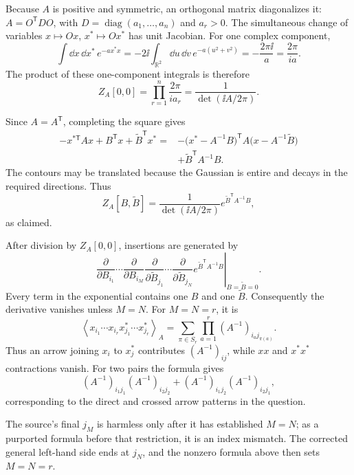 
\begin{enumerate}
Because \(A\) is positive and symmetric, an orthogonal matrix diagonalizes
it: \(A=O^{\mathsf T}DO\), with \(D=\operatorname{diag}(a_1,\ldots,a_n)\) and
\(a_r>0\).  The simultaneous change of variables
\(x\mapsto Ox\), \(x^*\mapsto Ox^*\) has unit Jacobian.  For one complex
component,
\[
 \int \dd x\,\dd x^*\,e^{-a x^*x}
 =-2\ii\int_{\mathbb R^2}\dd u\,\dd v\,e^{-a(u^2+v^2)}
 =-\frac{2\pi \ii}{a}=\frac{2\pi}{ia}.
\]
The product of these one-component integrals is therefore
\[
 Z_A[0,0]
 =\prod_{r=1}^n\frac{2\pi}{ia_r}
 =\frac{1}{\det(\ii A/2\pi)}.
\]

Since \(A=A^{\mathsf T}\), completing the square gives
\[
\begin{split}
 -x^{*\mathsf T}Ax+B^{\mathsf T}x+\widetilde B^{\mathsf T}x^*
 ={}&-\bigl(x^*-A^{-1}B\bigr)^{\mathsf T}
 A\bigl(x-A^{-1}\widetilde B\bigr)\\
 &+\widetilde B^{\mathsf T}A^{-1}B.
\end{split}
\]
The contours may be translated because the Gaussian is entire and
decays in the required directions.  Thus
\[
 Z_A[B,\widetilde B]
 =\frac{1}{\det(\ii A/2\pi)}
 e^{\widetilde B^{\mathsf T}A^{-1}B},
\]
as claimed.

After division by \(Z_A[0,0]\), insertions are generated by
\[
 \left.
 \frac{\partial}{\partial B_{i_1}}\cdots
 \frac{\partial}{\partial B_{i_M}}
 \frac{\partial}{\partial\widetilde B_{j_1}}\cdots
 \frac{\partial}{\partial\widetilde B_{j_N}}
 e^{\widetilde B^{\mathsf T}A^{-1}B}
 \right|_{B=\widetilde B=0}.
\]
Every term in the exponential contains one \(B\) and one
\(\widetilde B\).  Consequently the derivative vanishes unless \(M=N\).
For \(M=N=r\), it is
\[
 \boxed{
 \left\langle
 x_{i_1}\cdots x_{i_r}
 x^*_{j_1}\cdots x^*_{j_r}
 \right\rangle_A
 =\sum_{\pi\in S_r}\prod_{a=1}^r
 (A^{-1})_{i_a j_{\pi(a)}} }.
\]
Thus an arrow joining \(x_i\) to \(x_j^*\) contributes
\((A^{-1})_{ij}\), while \(xx\) and \(x^*x^*\) contractions vanish.
For two pairs the formula gives
\[
 (A^{-1})_{i_1j_1}(A^{-1})_{i_2j_2}
 +(A^{-1})_{i_1j_2}(A^{-1})_{i_2j_1},
\]
corresponding to the direct and crossed arrow patterns in the question.

The source's final \(j_M\) is harmless only after it has established
\(M=N\); as a purported formula before that restriction, it is an index
mismatch.  The corrected general left-hand side ends at \(j_N\), and the
nonzero formula above then sets \(M=N=r\).


\end{enumerate}

